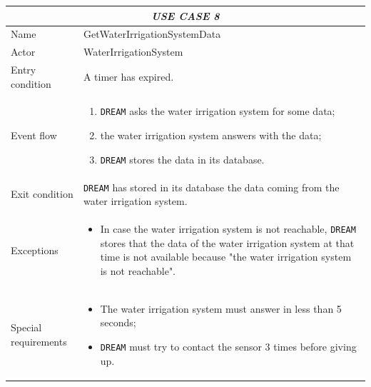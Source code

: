 \documentclass{article}
\begin{document}

\centering
\begin{longtable}{|p{3.5cm}|m{8cm}|}
 \hline
 \multicolumn{2}{|c|}{\cellcolor{white}\emph{USE CASE 8}} \\
 \endfirsthead
 \endhead
 \endfoot
 \endlastfoot
 \hline
 Name & GetWaterIrrigationSystemData\\
 \hline
 Actor & WaterIrrigationSystem\\
 \hline
 Entry condition & A timer has expired.\\
 \hline
 Event flow & \begin{enumerate}
    \item \verb|DREAM| asks the water irrigation system for some data;
    \item the water irrigation system answers with the data;
    \item \verb|DREAM| stores the data in its database.
 \end{enumerate}\\
 \hline
 Exit condition & \verb|DREAM| has stored in its database the data coming from the water irrigation system.\\
 \hline
 Exceptions & \begin{itemize}
     \item In case the water irrigation system is not reachable, \verb|DREAM| stores that the data of the water irrigation system at that time is not available because "the water irrigation system is not reachable".
 \end{itemize}\\
 \hline
 Special requirements &\begin{itemize}
     \item The water irrigation system must answer in less than 5 seconds;
     \item \verb|DREAM| must try to contact the sensor 3 times before giving up.
 \end{itemize}\\
 \hline
\end{longtable}
\end{document}
